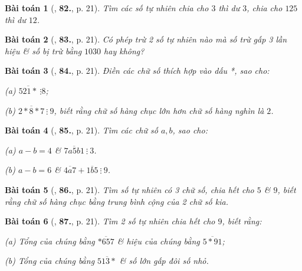 \documentclass[oneside]{book}
\numberwithin{equation}{section}
\newtheorem{baitoan}{Bài toán}[section]
\begin{document}
\begin{baitoan}[\cite{Binh_Toan_6_tap_1}, \textbf{82.}, p. 21]
	Tìm các số tự nhiên chia cho $3$ thì dư $3$, chia cho $125$ thì dư $12$.
\end{baitoan}

\begin{baitoan}[\cite{Binh_Toan_6_tap_1}, \textbf{83.}, p. 21]
	Có phép trừ 2 số tự nhiên nào mà số trừ gấp 3 lần hiệu \& số bị trừ bằng $1030$ hay không?
\end{baitoan}

\begin{baitoan}[\cite{Binh_Toan_6_tap_1}, \textbf{84.}, p. 21]
	Điền các chữ số thích hợp vào dấu *, sao cho:
	\begin{enumerate*}
		\item[(a)] $\overline{521*}\ \vdots 8$;
		\item[(b)] $\overline{2*8*7}\ \vdots\ 9$, biết rằng chữ số hàng chục lớn hơn chữ số hàng nghìn là $2$.
	\end{enumerate*}
\end{baitoan}

\begin{baitoan}[\cite{Binh_Toan_6_tap_1}, \textbf{85.}, p. 21]
	Tìm các chữ số $a,b$, sao cho:
	\begin{enumerate*}
		\item[(a)] $a - b =4$ \& $\overline{7a5b1}\ \vdots\ 3$.
		\item[(b)] $a - b = 6$ \& $\overline{4a7} + \overline{1b5}\ \vdots\ 9$.
	\end{enumerate*}
\end{baitoan}

\begin{baitoan}[\cite{Binh_Toan_6_tap_1}, \textbf{86.}, p. 21]
	Tìm số tự nhiên có 3 chữ số, chia hết cho $5$ \& $9$, biết rằng chữ số hàng chục bằng trung bình cộng của 2 chữ số kia.
\end{baitoan}

\begin{baitoan}[\cite{Binh_Toan_6_tap_1}, \textbf{87.}, p. 21]
	Tìm 2 số tự nhiên chia hết cho $9$, biết rằng:
	\begin{enumerate*}
		\item[(a)] Tổng của chúng bằng $\overline{*657}$ \& hiệu của chúng bằng $\overline{5*91}$;
		\item[(b)] Tổng của chúng bằng $\overline{513*}$ \& số lớn gấp đôi số nhỏ.
	\end{enumerate*}
\end{baitoan}
\end{document}
